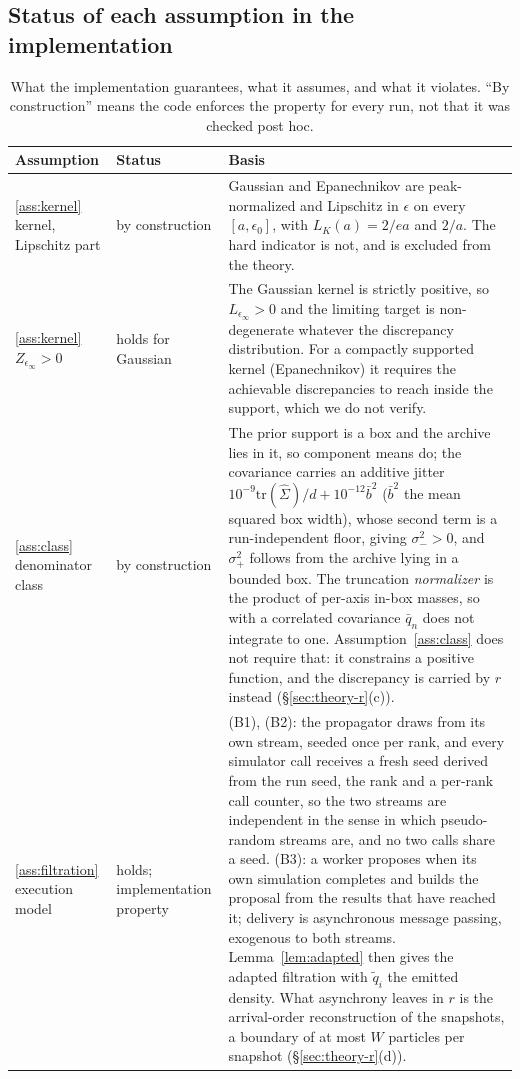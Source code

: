 \documentclass[10pt]{article}
\theoremstyle{plain}
\theoremstyle{definition}
\begin{document}
\subsection{Status of each assumption in the implementation}\label{app:theory-status}
\begin{table}[h]
\caption{What the implementation guarantees, what it assumes, and what it violates. ``By construction'' means the code enforces the property for every run, not that it was checked post hoc.}\label{tab:assumption-status}
\centering
\footnotesize
\setlength{\tabcolsep}{3pt}
\begin{tabular}{@{}p{}p{}p{}@{}}
\toprule
Assumption & Status & Basis \\
\midrule
\ref{ass:kernel} kernel, Lipschitz part & by construction & Gaussian and Epanechnikov are peak-normalized and Lipschitz in $\epsilon$ on every $[a,\epsilon_0]$, with $L_K(a)=2/ea$ and $2/a$. The hard indicator is not, and is excluded from the theory. \\
\ref{ass:kernel} $Z_{\epsilon_\infty}>0$ & holds for Gaussian & The Gaussian kernel is strictly positive, so $L_{\epsilon_\infty}>0$ and the limiting target is non-degenerate whatever the discrepancy distribution. For a compactly supported kernel (Epanechnikov) it requires the achievable discrepancies to reach inside the support, which we do not verify. \\
\ref{ass:class} denominator class & by construction & The prior support is a box and the archive lies in it, so component means do; the covariance carries an additive jitter $10^{-9}\mathrm{tr}(\widehat\Sigma)/d+10^{-12}\bar b^2$ ($\bar b^2$ the mean squared box width), whose second term is a run-independent floor, giving $\sigma_-^2>0$, and $\sigma_+^2$ follows from the archive lying in a bounded box. The truncation \emph{normalizer} is the product of per-axis in-box masses, so with a correlated covariance $\bar q_n$ does not integrate to one. Assumption~\ref{ass:class} does not require that: it constrains a positive function, and the discrepancy is carried by $r$ instead (\S\ref{sec:theory-r}(c)). \\
\ref{ass:filtration} execution model & holds; implementation property & (B1), (B2): the propagator draws from its own stream, seeded once per rank, and every simulator call receives a fresh seed derived from the run seed, the rank and a per-rank call counter, so the two streams are independent in the sense in which pseudo-random streams are, and no two calls share a seed. (B3): a worker proposes when its own simulation completes and builds the proposal from the results that have reached it; delivery is asynchronous message passing, exogenous to both streams. Lemma~\ref{lem:adapted} then gives the adapted filtration with $\tilde q_i$ the emitted density. What asynchrony leaves in $r$ is the arrival-order reconstruction of the snapshots, a boundary of at most $W$ particles per snapshot (\S\ref{sec:theory-r}(d)). \\

\end{tabular}
\end{table}
\end{document}
